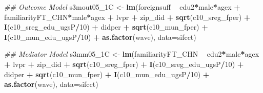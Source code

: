 \documentclass[
]{article}
\newenvironment{Shaded}{\begin{snugshade}}{\end{snugshade}}
\newcommand{\CommentTok}[1]{\textcolor[rgb]{0.56,0.35,0.01}{\textit{#1}}}
\newcommand{\DataTypeTok}[1]{\textcolor[rgb]{0.13,0.29,0.53}{#1}}
\newcommand{\DecValTok}[1]{\textcolor[rgb]{0.00,0.00,0.81}{#1}}
\newcommand{\KeywordTok}[1]{\textcolor[rgb]{0.13,0.29,0.53}{\textbf{#1}}}
\newcommand{\NormalTok}[1]{#1}
\newcommand{\OperatorTok}[1]{\textcolor[rgb]{0.81,0.36,0.00}{\textbf{#1}}}
\newcommand{\StringTok}[1]{\textcolor[rgb]{0.31,0.60,0.02}{#1}}
\begin{document}
\begin{Shaded}
\begin{Highlighting}[]
\CommentTok{## Outcome Model }
\NormalTok{s3mout05_1C <-}\StringTok{ }\KeywordTok{lm}\NormalTok{(foreignsuff  }\OperatorTok{~}\StringTok{ }\NormalTok{edu2}\OperatorTok{*}\NormalTok{male}\OperatorTok{*}\NormalTok{agex }\OperatorTok{+}\StringTok{ }\NormalTok{familiarityFT_CHN}\OperatorTok{*}\NormalTok{male}\OperatorTok{*}\NormalTok{agex }\OperatorTok{+}\StringTok{ }\NormalTok{lvpr }\OperatorTok{+}\StringTok{  }
\StringTok{                    }\NormalTok{zip_did }\OperatorTok{+}\StringTok{ }\KeywordTok{sqrt}\NormalTok{(c10_sreg_fper) }\OperatorTok{+}\StringTok{ }\KeywordTok{I}\NormalTok{(c10_sreg_edu_ugsP}\OperatorTok{/}\DecValTok{10}\NormalTok{) }\OperatorTok{+}\StringTok{ }
\StringTok{                    }\NormalTok{didper }\OperatorTok{+}\StringTok{ }\KeywordTok{sqrt}\NormalTok{(c10_mun_fper) }\OperatorTok{+}\StringTok{ }\KeywordTok{I}\NormalTok{(c10_mun_edu_ugsP}\OperatorTok{/}\DecValTok{10}\NormalTok{) }\OperatorTok{+}\StringTok{ }
\StringTok{                    }\KeywordTok{as.factor}\NormalTok{(wave), }\DataTypeTok{data=}\NormalTok{sifcct)}

\CommentTok{## Mediator Model}
\NormalTok{s3mm05_1C <-}\StringTok{ }\KeywordTok{lm}\NormalTok{(familiarityFT_CHN  }\OperatorTok{~}\StringTok{ }\NormalTok{edu2}\OperatorTok{*}\NormalTok{male}\OperatorTok{*}\NormalTok{agex }\OperatorTok{+}\StringTok{ }\NormalTok{lvpr }\OperatorTok{+}\StringTok{  }
\StringTok{                  }\NormalTok{zip_did }\OperatorTok{+}\StringTok{ }\KeywordTok{sqrt}\NormalTok{(c10_sreg_fper) }\OperatorTok{+}\StringTok{ }\KeywordTok{I}\NormalTok{(c10_sreg_edu_ugsP}\OperatorTok{/}\DecValTok{10}\NormalTok{) }\OperatorTok{+}\StringTok{ }
\StringTok{                  }\NormalTok{didper }\OperatorTok{+}\StringTok{ }\KeywordTok{sqrt}\NormalTok{(c10_mun_fper) }\OperatorTok{+}\StringTok{ }\KeywordTok{I}\NormalTok{(c10_mun_edu_ugsP}\OperatorTok{/}\DecValTok{10}\NormalTok{) }\OperatorTok{+}\StringTok{ }
\StringTok{                  }\KeywordTok{as.factor}\NormalTok{(wave), }\DataTypeTok{data=}\NormalTok{sifcct)}


\end{Highlighting}
\end{Shaded}
\end{document}
